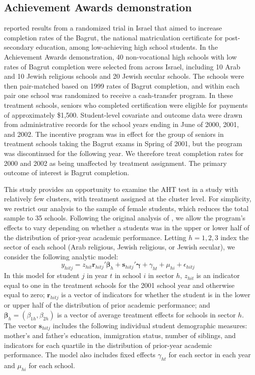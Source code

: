 \documentclass[12pt]{article}\usepackage[]{graphicx}\usepackage[]{color}
\newcommand{\bm}{\mathbf}
\newcommand{\bs}{\boldsymbol}
\begin{document}
\subsection{Achievement Awards demonstration} 

\citet{Angrist2009effects} reported results from a randomized trial in Israel that aimed to increase completion rates of the Bagrut, the national matriculation certificate for post-secondary education, among low-achieving high school students. 
In the Achievement Awards demonstration, 40 non-vocational high schools with low rates of Bagrut completion were selected from across Israel, including 10 Arab and 10 Jewish religious schools and 20 Jewish secular schools. 
The schools were then pair-matched based on 1999 rates of Bagrut completion, and within each pair one school was randomized to receive a cash-transfer program. 
In these treatment schools, seniors who completed certification were eligible for payments of approximately \$1,500. 
Student-level covariate and outcome data were drawn from administrative records for the school years ending in June of 2000, 2001, and 2002. 
The incentive program was in effect for the group of seniors in treatment schools taking the Bagrut exams in Spring of 2001, but the program was discontinued for the following year. 
We therefore treat completion rates for 2000 and 2002 as being unaffected by treatment assignment.
The primary outcome of interest is Bagrut completion. 

This study provides an opportunity to examine the AHT test in a study with relatively few clusters, with treatment assigned at the cluster level.
For simplicity, we restrict our analysis to the sample of female students, which reduces the total sample to 35 schools.
Following the original analysis of \citet{Angrist2009effects}, we allow the program's effects to vary depending on whether a students was in the upper or lower half of the distribution of prior-year academic performance. 
Letting $h = 1,2,3$ index the sector of each school (Arab religious, Jewish religious, or Jewish secular), we consider the following analytic model: 
\begin{equation}
\label{eq:AL_ATE}
y_{hitj} = z_{hit}\bm{r}_{hitj}'\bs\beta_h + \bm{s}_{hitj}'\bs\gamma + \gamma_{ht} + \mu_{hi} + \epsilon_{hitj}
\end{equation}
In this model for student $j$ in year $t$ in school $i$ in sector $h$, $z_{hit}$ is an indicator equal to one in the treatment schools for the 2001 school year and otherwise equal to zero; $\bm{r}_{hitj}$ is a vector of indicators for whether the student is in the lower or upper half of the distribution of prior academic performance; and $\bs\beta_h = \left(\beta_{1h}, \beta_{2h}\right)$ is a vector of average treatment effects for schools in sector $h$. 
The vector $\bm{s}_{hitj}$ includes the following individual student demographic measures: mother's and father's education, immigration status, number of siblings, and indicators for each quartile in the distribution of prior-year academic performance. 
The model also includes fixed effects $\gamma_{ht}$ for each sector in each year and $\mu_{hi}$ for each school. 
\end{document}
